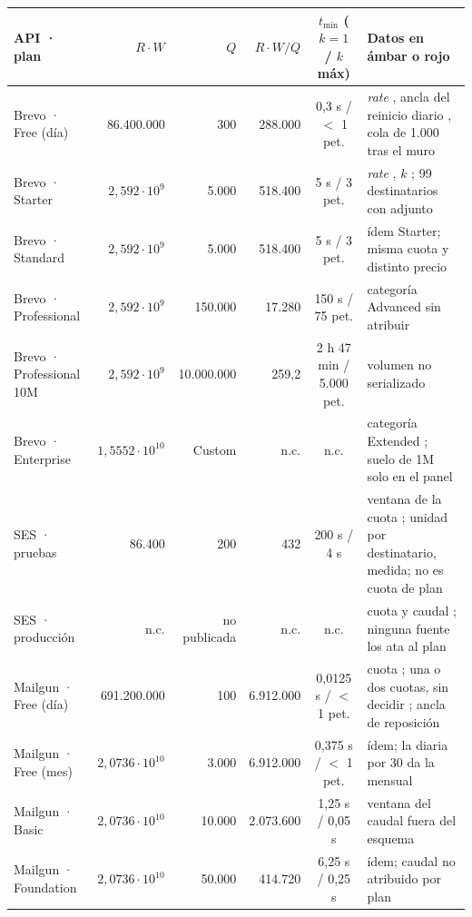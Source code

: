 \begin{table}[H]
\centering
\scriptsize
\setlength{\tabcolsep}{3pt}
\begin{tabular}{|l|r|r|r|c|p{2.7cm}|}
\hline
\textbf{API · plan} & \textbf{$R \cdot W$} & \textbf{$Q$} & \textbf{$R \cdot W / Q$} & \textbf{$t_{\min}$ ($k{=}1$ / $k$ máx)} & \textbf{Datos en ámbar o rojo} \\
\hline
Brevo · Free (día) & 86.400.000 & 300 & 288.000 & 0,3 s / $<$ 1 pet. & \textit{rate} \semambar{}, ancla del reinicio diario \semrojo{}, cola de 1.000 tras el muro \\
\hline
Brevo · Starter & $2{,}592 \cdot 10^{9}$ & 5.000 & 518.400 & 5 s / 3 pet. & \textit{rate} \semambar{}, $k$ \semambar{}; 99 destinatarios con adjunto \\
\hline
Brevo · Standard & $2{,}592 \cdot 10^{9}$ & 5.000 & 518.400 & 5 s / 3 pet. & ídem Starter; misma cuota y distinto precio \\
\hline
Brevo · Professional & $2{,}592 \cdot 10^{9}$ & 150.000 & 17.280 & 150 s / 75 pet. & categoría Advanced sin atribuir \semambar{} \\
\hline
Brevo · Professional 10M & $2{,}592 \cdot 10^{9}$ & 10.000.000 & 259,2 & 2 h 47 min / 5.000 pet. & volumen no serializado \\
\hline
Brevo · Enterprise & $1{,}5552 \cdot 10^{10}$ & Custom & n.c. & n.c. & categoría Extended \semambar{}; suelo de 1M solo en el panel \\
\hline
SES · pruebas & 86.400 & 200 & 432 & 200 s / 4 s & ventana de la cuota \semrojo{}; unidad por destinatario, medida; no es cuota de plan \\
\hline
SES · producción & n.c. & no publicada & n.c. & n.c. & cuota \semrojo{} y caudal \semrojo{}; ninguna fuente los ata al plan \\
\hline
Mailgun · Free (día) & 691.200.000 & 100 & 6.912.000 & 0,0125 s / $<$ 1 pet. & cuota \semverde{}; una o dos cuotas, sin decidir \semambar{}; ancla de reposición \semrojo{} \\
\hline
Mailgun · Free (mes) & $2{,}0736 \cdot 10^{10}$ & 3.000 & 6.912.000 & 0,375 s / $<$ 1 pet. & ídem; la diaria por 30 da la mensual \\
\hline
Mailgun · Basic & $2{,}0736 \cdot 10^{10}$ & 10.000 & 2.073.600 & 1,25 s / 0,05 s & ventana del caudal fuera del esquema \semambar{} \\
\hline
Mailgun · Foundation & $2{,}0736 \cdot 10^{10}$ & 50.000 & 414.720 & 6,25 s / 0,25 s & ídem; caudal no atribuido por plan \semambar{} \\

\end{tabular}
\end{table}
